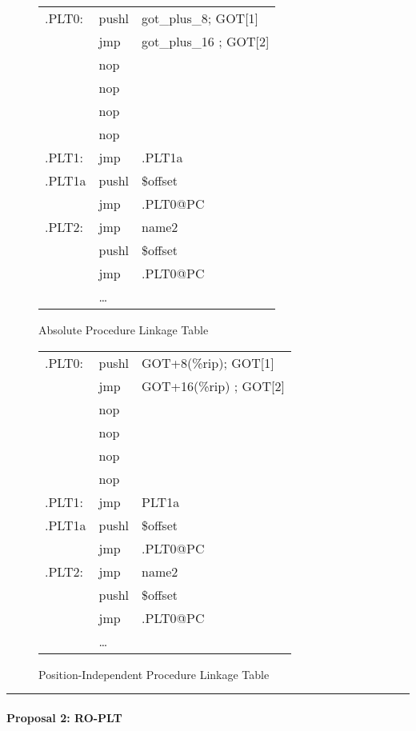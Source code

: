 \begin{figure}[H]
\caption{Absolute Procedure Linkage Table}
\begin{tabular}{lll}
.PLT0: & pushl & got\_plus\_8; GOT[1]\\
& jmp &got\_plus\_16 ; GOT[2] \\
& nop & \\
& nop & \\
& nop & \\
& nop & \\
.PLT1: & jmp & .PLT1a \\
.PLT1a& pushl & \$offset \\
&jmp &.PLT0@PC \\
.PLT2: & jmp& name2\\
&pushl & \$offset \\
& jmp & .PLT0@PC \\
&\dots\\
\end{tabular}
\end{figure}


\begin{figure}[H]
\caption{Position-Independent Procedure Linkage Table}
\begin{tabular}{lll}
.PLT0: & pushl & GOT+8(\%rip); GOT[1]\\
& jmp &GOT+16(\%rip) ; GOT[2] \\
& nop & \\
& nop & \\
& nop & \\
& nop & \\
.PLT1: & jmp & PLT1a\\
.PLT1a& pushl & \$offset \\
&jmp &.PLT0@PC \\
.PLT2: & jmp& name2\\
&pushl & \$offset \\
& jmp & .PLT0@PC \\
&\dots\\
\end{tabular}
\end{figure}


\bigskip\hrule

\paragraph{Proposal 2: RO-PLT}

